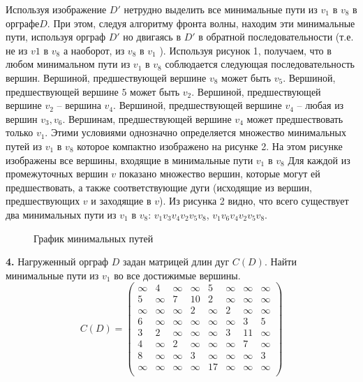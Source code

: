 \documentclass[12pt, letterpaper, titlepage]{article}
\begin{document}
Используя изображение $D'$ нетрудно выделить все минимальные пути из $v_1$ в $v_8$
в орграфе$D$. При этом, следуя алгоритму фронта волны, находим эти минимальные пути, используя орграф $D'$
но двигаясь в $D'$ в обратной последовательности (т.е. не из $v1$ в $v_8$ а наоборот, из $v_8$
в $v_1$ ). Используя рисунок 1, получаем, что в любом минимальном пути из $v_1$ в $v_8$
соблюдается следующая последовательность вершин. Вершиной, предшествующей
вершине $v_8$ может быть $v_5$. Вершиной, предшествующей вершине $5$
может быть $v_2$. Вершиной, предшествующей вершине $v_2$ – вершина $v_4$. 
Вершиной, предшествующей вершине $v_4$ – любая из вершин $v_3,v_6$. 
Вершинам, предшествующей вершине $v_4$ может предшествовать только $v_1$. Этими условиями однозначно определяется множество
минимальных путей из $v_1$ в $v_8$ которое компактно изображено на рисунке 2. На этом
рисунке изображены все вершины, входящие в минимальные пути $v_1$ в $v_8$ Для каждой
из промежуточных вершин $v$ показано множество вершин, которые могут ей
предшествовать, а также соответствующие дуги (исходящие из вершин, предшествующих $v$
и заходящие в $v$). Из рисунка 2 видно, что всего существует два минимальных пути из $v_1$ в
$v_8$: $v_1v_3v_4v_2v_5v_8$, $v_1v_6v_4v_2v_5v_8$.
\begin{figure}[H]\centering\caption{График минимальных путей}\end{figure}
\textbf{4.} Нагруженный орграф $D$ задан матрицей длин дуг $C(D)$. Найти минимальные пути из $v_1$ во все достижимые вершины.
\[
C(D)=
\begin{pmatrix}
    \infty & 4      & \infty & \infty & 5      & \infty & \infty & \infty \\
    5      & \infty & 7      & 10     & 2      & \infty & \infty & \infty \\
    \infty & \infty & \infty & 2      & \infty & 2      & \infty & \infty \\
    6      & \infty & \infty & \infty & \infty & \infty & 3      & 5      \\
    3      & 2      & \infty & \infty & \infty & 3      & 11     & \infty \\
    4      & \infty & 2      & \infty & \infty & \infty & 7      & \infty \\
    8      & \infty & \infty & 3      & \infty & \infty & \infty & 3      \\
    \infty & \infty & \infty & \infty & 17     & \infty & \infty & \infty \\
\end{pmatrix}
\]
\end{document}
